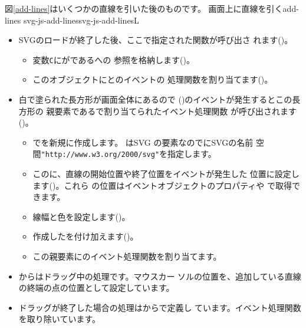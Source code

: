 図\ref{add-lines}はいくつかの直線を引いた後のものです。
{画面上に直線を引く}{add-lines}
{}
{svg-js-add-lines}{svg-js-add-linesL}
\begin{itemize}
 \item SVGのロードが終了した後、ここで指定された関数が呼び出さ
       れます()。
\begin{itemize}
 \item 変数\texttt{C}にがであるへの
       参照を格納します()。
 \item このオブジェクトにとのイベントの
       処理関数を割り当てます()。
\end{itemize}
 \item 白で塗られた長方形が画面全体にあるので
       ()のイベントが発生するとこの長方形の
       親要素であるで割り当てられたイベント処理関数
       が呼び出されます()。
\begin{itemize}
 \item {}でを新規に作成します。 はSVG
       の要素なのでにSVGの名前
       空間\texttt{"http://www.w3.org/2000/svg"}を指定します。
 \item このに、直線の開始位置や終了位置をイベントが発生した
       位置に設定します()。これら
       の位置はイベントオブジェクトのプロパティや
       で取得できます。
 \item 線幅と色を設定します()。
 \item 作成したを付け加えます()。
 \item この親要素にのイベント処理関数を割り当てます。
\end{itemize}
 \item {}からはドラッグ中の処理です。マウスカー
       ソルの位置を、追加している直線の終端の点の位置として設定しています。
 \item ドラッグが終了した場合の処理はからで定義し
       ています。イベント処理関数を取り除いています。
\end{itemize}
